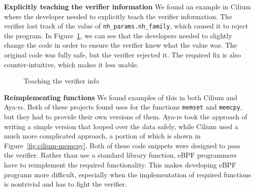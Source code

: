 
\noindent\textbf{Explicitly teaching the verifier information}
We found an example in Cilium where the developer needed to explicitly teach the verifier
    information.
The verifier lost track of the value of \texttt{nh\_params.nh\_family}, which caused it to reject the program.
In Figure~\ref{fig:teach-verifier}, we can see that the developers needed to slightly change the code in order to ensure the verifier knew what the value was.
The original code was fully safe, but the verifier rejected it.
The required fix is also counter-intuitive, which makes it less usable.

\begin{figure}
    
    \vspace{-10pt}
    \caption{Teaching the verifier info}
    \vspace{-10pt}
    \label{fig:teach-verifier}
\end{figure}

\noindent\textbf{Reimplementing functions}
We found examples of this in both Cilium and Aya-rs.
Both of these projects found uses for the functions \texttt{memset} and \texttt{memcpy}, but they had to provide their own versions of them.
Aya-rs took the approach of writing a simple version that looped over the data safely, while Cilium used a much more complicated approach, a portion of which is shown in Figure~\ref{fig:cilium-memcpy}.
Both of these code snippets were designed to pass the verifier.
Rather than use a standard library function, eBPF programmers have to reimplement the required functionality.
This makes developing eBPF programs more difficult, especially when the implementation of
    required functions is nontrivial and has to fight the verifier.

